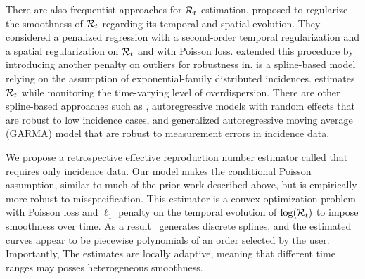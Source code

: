 There are also frequentist approaches for $\mathcal{R}_t$ estimation.
\citet{abry2020spatial} proposed to regularize the smoothness of $\mathcal{R}_t$
regarding its temporal and spatial evolution. They considered a penalized
regression with a second-order temporal regularization and a spatial
regularization on $\mathcal{R}_t$ and with Poisson loss. \citet{pascal2022nonsmooth}
extended this procedure by introducing another penalty on outliers for robustness in.  
%
\cite{pircal2023spline} is a spline-based model relying on the assumption of exponential-family distributed incidences. %
\cite{ho2023accounting} estimates $\mathcal{R}_t$ while monitoring the time-varying
level of overdispersion. 
%
There are other spline-based approaches such as
\cite{azmon2014estimation,gressani2021approximate,pircalabelu2023spline},
autoregressive models with random effects \citep{jin2023epimix} that are robust
to low incidence cases, and generalized autoregressive moving average (GARMA)
model \citep{hettinger2023estimating} that are robust to measurement errors in
incidence data. 
%


We propose a retrospective effective reproduction number estimator
called \RtEstim that requires only incidence data. Our model makes the
conditional Poisson assumption, similar to much of the prior work described
above, but is empirically more robust to misspecification. This estimator is a
convex optimization problem with Poisson loss and $\ell_1$ penalty on the
temporal evolution of $\log(\mathcal{R}_t)$ to impose smoothness over time. 
As a result \RtEstim\ generates discrete splines, and the estimated curves
appear to be piecewise polynomials of an order selected by the user.
Importantly, The estimates are locally adaptive, meaning that different time
ranges may posses heterogeneous smoothness.

